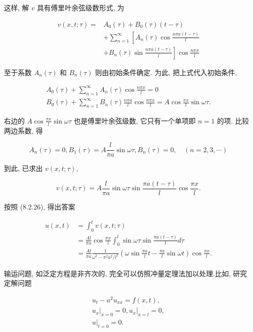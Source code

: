 \begin{solution}
这样, 解 $v$ 具有傅里叶余弦级数形式, 为

$$
\begin{aligned}
v(x, t ; \tau)= & A_{0}(\tau)+B_{0}(\tau)(t-\tau) \\
& +\sum_{n=1}^{\infty}\left[A_{n}(\tau) \cos \frac{n \pi a(t-\tau)}{l}\right. \\
& \left.+B_{n}(\tau) \sin \frac{n \pi a(t-\tau)}{l}\right] \cos \frac{n \pi x}{l}
\end{aligned}
$$

至于系数 $A_{n}(\tau)$ 和 $B_{n}(\tau)$ 则由初始条件确定. 为此, 把上式代入初始条件,

$$
\begin{gathered}
A_{0}(\tau)+\sum_{n=1}^{\infty} A_{n}(\tau) \cos \frac{n \pi x}{l}=0 \\
B_{0}(\tau)+\sum_{n=1}^{\infty} B_{n}(\tau) \frac{n \pi a}{l} \cos \frac{n \pi x}{l}=A \cos \frac{\pi x}{l} \sin \omega \tau .
\end{gathered}
$$

右边的 $A \cos \frac{\pi x}{l} \sin \omega \tau$ 也是傅里叶余弦级数, 它只有一个单项即 $n=1$ 的项. 比较两边系数, 得

$$
A_{n}(\tau)=0, B_{1}(\tau)=A \frac{l}{\pi a} \sin \omega \tau, B_{n}(\tau)=0, \quad(n=2,3, \cdots)
$$

到此, 已求出 $v(x, t ; \tau)$,

$$
v(x, t ; \tau)=A \frac{l}{\pi a} \sin \omega \tau \sin \frac{\pi a(t-\tau)}{l} \cos \frac{\pi x}{l} .
$$

按照 (8.2.26), 得出答案

$$
\begin{aligned}
u(x, t) & =\int_{0}^{t} v(x, t ; \tau) \\
& =\frac{A l}{\pi a} \cos \frac{\pi x}{l} \int_{0}^{l} \sin \omega \tau \sin \frac{\pi a(t-\tau)}{l} d \tau \\
& =\frac{A l}{\pi a} \frac{1}{\omega^{2}-\pi^{2} a^{2} / l^{2}}\left(\omega \sin \frac{\pi a}{l} t-\frac{\pi a}{l} \sin \omega t\right) \cos \frac{\pi x}{l} .
\end{aligned}
$$

输运问题, 如泛定方程是非齐次的, 完全可以仿照冲量定理法加以处理.比如, 研究定解问题

$$
\begin{gathered}
u_{t}-a^{2} u_{x x}=f(x, t), \\
\left.u_{x}\right|_{x=0}=0,\left.u_{x}\right|_{x=l}=0, \\
\left.u\right|_{t=0}=0 .
\end{gathered}
$$


\end{solution}
